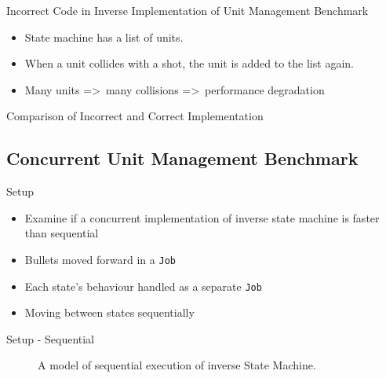 \begin{frame}{\secname}{\subsecname}
	Incorrect Code in Inverse Implementation of Unit Management Benchmark
	\begin{itemize}
		\item State machine has a list of units.
		\item When a unit collides with a shot, the unit is added to the list again.
		\item Many units =\textgreater\ many collisions =\textgreater\ performance degradation
	\end{itemize} 
\end{frame}

\begin{frame}[fragile]{\secname}{\subsecname}
	Comparison of Incorrect and Correct Implementation
\end{frame}

\subsection{Concurrent Unit Management Benchmark}

\begin{frame}{\secname}{\subsecname}
	Setup
	\begin{itemize}
		\item Examine if a concurrent implementation of inverse state machine is faster than sequential
		\item Bullets moved forward in a \texttt{Job}
		\item Each state's behaviour handled as a separate \texttt{Job}
		\item Moving between states sequentially
	\end{itemize}
\end{frame}

\begin{frame}{\secname}{\subsecname}
	Setup - Sequential
	\begin{figure}[h!]
        \centering
        
        \caption{A model of sequential execution of inverse State Machine.}
    \end{figure}
\end{frame}

